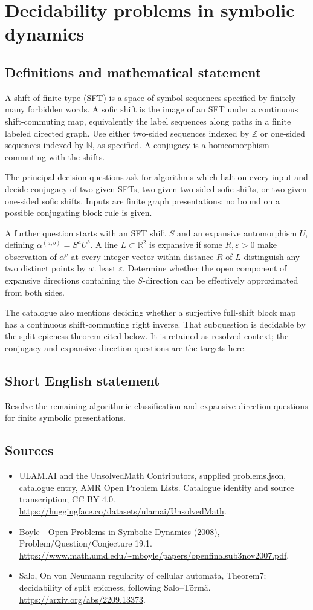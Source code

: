 \documentclass[11pt,a4paper]{article}
\begin{document}
\section*{Decidability problems in symbolic dynamics}\label{statement}

\subsection{Definitions and mathematical statement}
A shift of finite type (SFT) is a space of symbol sequences specified by
finitely many forbidden words. A sofic shift is the image of an SFT under
a continuous shift-commuting map, equivalently the label sequences along
paths in a finite labeled directed graph. Use either two-sided sequences
indexed by $\mathbb Z$ or one-sided sequences indexed by $\mathbb N$, as
specified. A conjugacy is a homeomorphism commuting with the shifts.

The principal decision questions ask for algorithms which halt on every
input and decide conjugacy of two given SFTs, two given two-sided sofic
shifts, or two given one-sided sofic shifts. Inputs are finite graph
presentations; no bound on a possible conjugating block rule is given.

A further question starts with an SFT shift $S$ and an expansive
automorphism $U$, defining $\alpha^{(a,b)}=S^aU^b$. A line $L\subset
\mathbb R^2$ is expansive if some $R,\varepsilon>0$ make observation of
$\alpha^v$ at every integer vector within distance $R$ of $L$ distinguish
any two distinct points by at least $\varepsilon$. Determine whether the
open component of expansive directions containing the $S$-direction can
be effectively approximated from both sides.

The catalogue also mentions deciding whether a surjective full-shift
block map has a continuous shift-commuting right inverse. That subquestion
is decidable by the split-epicness theorem cited below. It is retained
as resolved context; the conjugacy and expansive-direction questions
are the targets here.
\subsection{Short English statement}
Resolve the remaining algorithmic classification and expansive-direction questions for finite symbolic presentations.
\subsection{Sources}
\begin{itemize}
\item[S1] ULAM.AI and the UnsolvedMath Contributors, supplied problems.json, catalogue entry, AMR Open Problem Lists. Catalogue identity and source transcription; CC BY 4.0.
\url{https://huggingface.co/datasets/ulamai/UnsolvedMath}.
\item[S2] Boyle - Open Problems in Symbolic Dynamics (2008), Problem/Question/Conjecture 19.1. 
\url{https://www.math.umd.edu/~mboyle/papers/openfinalsub3nov2007.pdf}.
\item[S3] Salo, On von Neumann regularity of cellular automata, Theorem7; decidability of split epicness, following Salo–Törmä.
\url{https://arxiv.org/abs/2209.13373}.
\end{itemize}
\end{document}
